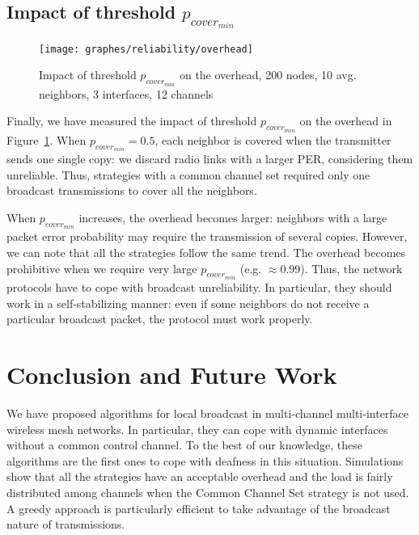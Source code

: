 \documentclass[twoside]{article}
\begin{document}
\subsection{Impact of threshold $p_{cover_{min}}$}
\begin{figure}
\begin{center}
	\texttt{[image: graphes/reliability/overhead]}
	\caption{Impact of threshold $p_{cover_{min}}$  on the overhead, 200 nodes, 10 avg. neighbors, 3 interfaces, 12 channels}
	\label{fig:reliability_overhead}
\end{center}
\end{figure}


Finally, we have measured the impact of threshold $p_{cover_{min}}$ on the overhead in Figure~\ref{fig:reliability_overhead}.
When $p_{cover_{min}}=0.5$, each neighbor is covered when the transmitter sends one single copy: we discard radio links with a larger PER, considering them unreliable. 
Thus, strategies with a common channel set required only one broadcast transmissions to cover all the neighbors.

When $p_{cover_{min}}$ increases, the overhead becomes larger: neighbors with a
large packet error probability may require the transmission of several copies.
However, we can note that all the strategies follow the same trend.  
The overhead becomes prohibitive when we require very large $p_{cover_{min}}$ (e.g. $\approx 0.99$).
Thus, the network protocols have to cope with broadcast unreliability.
In particular, they should work in a self-stabilizing manner: even if some neighbors do not receive a particular broadcast packet, the protocol must work properly. 







\section{Conclusion and Future Work}
\label{section:conclusion}


We have proposed algorithms for local broadcast in multi-channel
multi-interface wireless mesh networks.
In particular, they can cope with dynamic interfaces without a common control channel. 
To the best of our knowledge, these algorithms are the first ones to cope with deafness in this situation. 
Simulations show that all the strategies have an acceptable overhead and the load is fairly distributed among channels when the Common Channel Set strategy is not used.
A greedy approach is particularly efficient to take advantage of the broadcast
nature of transmissions.  
\end{document}
